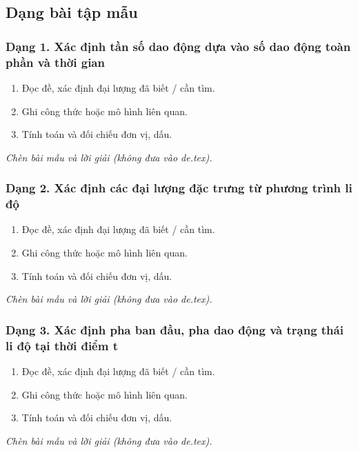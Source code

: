

\subsection{Dạng bài tập mẫu}
\subsubsection{Dạng 1. Xác định tần số dao động dựa vào số dao động toàn phần và thời gian}
\begin{phuongphap}
\begin{enumerate}
\item Đọc đề, xác định đại lượng đã biết / cần tìm.
\item Ghi công thức hoặc mô hình liên quan.
\item Tính toán và đối chiếu đơn vị, dấu.
\end{enumerate}
\end{phuongphap}
\begin{vidumau}
\textit{Chèn bài mẫu và lời giải (không đưa vào de.tex).}
\end{vidumau}

\subsubsection{Dạng 2. Xác định các đại lượng đặc trưng từ phương trình li độ}
\begin{phuongphap}
\begin{enumerate}
\item Đọc đề, xác định đại lượng đã biết / cần tìm.
\item Ghi công thức hoặc mô hình liên quan.
\item Tính toán và đối chiếu đơn vị, dấu.
\end{enumerate}
\end{phuongphap}
\begin{vidumau}
\textit{Chèn bài mẫu và lời giải (không đưa vào de.tex).}
\end{vidumau}

\subsubsection{Dạng 3. Xác định pha ban đầu, pha dao động và trạng thái li độ tại thời điểm t}
\begin{phuongphap}
\begin{enumerate}
\item Đọc đề, xác định đại lượng đã biết / cần tìm.
\item Ghi công thức hoặc mô hình liên quan.
\item Tính toán và đối chiếu đơn vị, dấu.
\end{enumerate}
\end{phuongphap}
\begin{vidumau}
\textit{Chèn bài mẫu và lời giải (không đưa vào de.tex).}
\end{vidumau}

